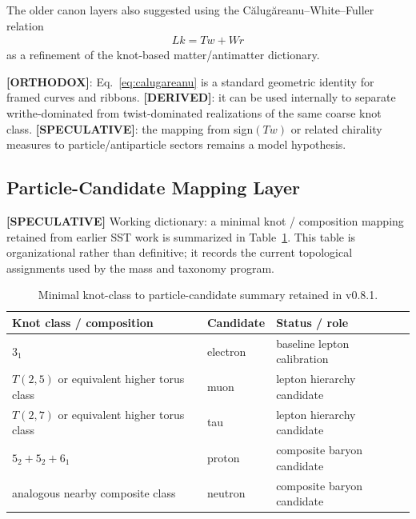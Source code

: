 \documentclass[11pt]{article}
\theoremstyle{definition}
\theoremstyle{plain}
\theoremstyle{remark}
\begin{document}
        The older canon layers also suggested using the C\u{a}lug\u{a}reanu--White--Fuller relation
        \begin{align}
            Lk = Tw + Wr
            \label{eq:calugareanu}
        \end{align}
        as a refinement of the knot-based matter/antimatter dictionary.

        \textbf{[ORTHODOX]}: Eq.~\eqref{eq:calugareanu} is a standard geometric identity for framed curves and ribbons.\newline
        \textbf{[DERIVED]}: it can be used internally to separate writhe-dominated from twist-dominated realizations of the same coarse knot class.\newline
        \textbf{[SPECULATIVE]}: the mapping from sign$(Tw)$ or related chirality measures to particle/antiparticle sectors remains a model hypothesis.

    \subsection{Particle-Candidate Mapping Layer}
        \label{subsec:integration_knotmap}

        \textbf{[SPECULATIVE]} Working dictionary: a minimal knot / composition mapping retained from earlier SST work is summarized
        in Table~\ref{tab:particle_candidate_mapping}. This table is organizational rather than definitive; it records
        the current topological assignments used by the mass and taxonomy program.

        \begin{table}[h]
        \centering
        \caption{Minimal knot-class to particle-candidate summary retained in v0.8.1.}
        \label{tab:particle_candidate_mapping}
        \begin{tabular}{lll}
        \hline
        Knot class / composition & Candidate & Status / role \\
        \hline
        $3_1$ & electron & baseline lepton calibration \\
        $T(2,5)$ or equivalent higher torus class & muon & lepton hierarchy candidate \\
        $T(2,7)$ or equivalent higher torus class & tau & lepton hierarchy candidate \\
        $5_2 + 5_2 + 6_1$ & proton & composite baryon candidate \\
        analogous nearby composite class & neutron & composite baryon candidate \\
        \hline
        \end{tabular}
        \end{table}
\end{document}
